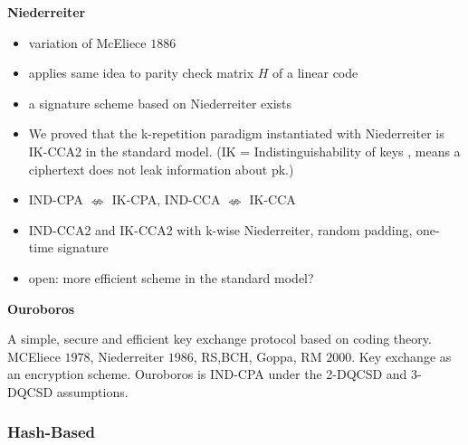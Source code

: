 \documentclass[a4paper,11pt]{article}
\begin{document}
\begin{multicols}{2}
\textbf{Niederreiter}
\begin{itemize} 
\item variation of McEliece $1886$
\item applies same idea to parity check matrix $H$ of a linear code
\item a signature scheme based on Niederreiter exists
\item We proved	that the k-repetition paradigm instantiated	with Niederreiter is IK-CCA2 in	the	standard model.	(IK = Indistinguishability	of keys , means	a ciphertext does not leak information about pk.)
\item IND-CPA $\nLeftrightarrow$ IK-CPA, IND-CCA $\nLeftrightarrow$ IK-CCA
\item IND-CCA2 and IK-CCA2 with k-wise Niederreiter, random padding, one-time signature
\item open: more efficient scheme in the standard model?
\end{itemize} 

\textbf{Ouroboros}

A simple, secure and efficient key exchange protocol based on coding theory. MCEliece $1978$, Niederreiter $1986$, RS,BCH, Goppa, RM $2000$. Key exchange as an encryption scheme. Ouroboros is IND-CPA under the 2-DQCSD and 3-DQCSD assumptions.

\subsubsection{Hash-Based}


\end{multicols}
\end{document}
